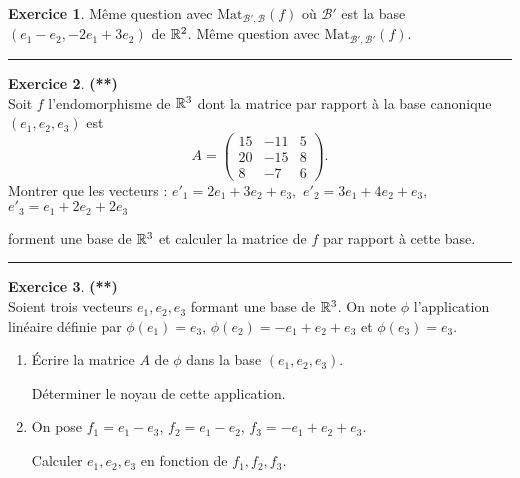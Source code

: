 \documentclass[a4paper,11pt]{article}
\theoremstyle{definition}
\newtheorem{exo}{Exercice} %
\begin{document}
\begin{minipage}{1\linewidth}
\begin{minipage}[t]{0.48\linewidth}
\begin{exo}
		Même question avec $\textrm{Mat}_{\mathcal{B}',\mathcal{B}}(f)$ où $\mathcal{B'}$ est la base 
		$(e_1 - e_2, -2e_1+3e_2)$ de $\mathbb{R}^2$.
		Même question avec $\textrm{Mat}_{\mathcal{B}',\mathcal{B}'}(f)$.	
			
		\centering\rule{1\linewidth}{0.6pt}\end{exo}
	
		\begin{exo}\textbf{(**)}\quad\\[0.2cm]
			Soit $f$ l'endomorphisme de $\mathbb{R}^3$ dont la matrice par
			rapport \`a la base canonique $(e_1, e_2, e_3)$ est
			$$A= \left( 
			\begin{array}{ccc}
			15 & -11 & 5 \\
			20 & -15 & 8 \\
			8 &  -7 & 6
			\end{array}
			\right).$$
			Montrer que les vecteurs : $ e'_1 = 2e_1+3e_2+e_3,$ $ e'_2 = 3e_1+4e_2+e_3,$\quad $ e'_3 = e_1+2e_2+2e_3$
			
			forment une base de $\mathbb{R}^3$ et calculer la matrice de $f$ par
			rapport \`a cette base.
	
	\centering\rule{1\linewidth}{0.6pt}\end{exo}
		
		
	\end{minipage}\hfill\vrule\hfill\begin{minipage}[t]{0.48\linewidth}\raggedright
		
					\begin{exo}\textbf{(**)}\quad\\[0.2cm]
			Soient trois vecteurs $e_1,e_2,e_3$ formant une base de $\mathbb{R}^3$.
			On note $\phi$ l'application linéaire définie par
			$\phi(e_1)=e_3$, $\phi(e_2)=-e_1+e_2+e_3$ et $\phi(e_3)=e_3$.
			
			\begin{enumerate}
				\item Écrire la matrice $A$ de $\phi$ dans la base $(e_1,e_2,e_3)$.
				
				Déterminer le noyau de cette application. 
				
				\item On pose $f_1=e_1-e_3$, $f_2=e_1-e_2$,  $f_3=-e_1+e_2+e_3$.
				
				Calculer $e_1,e_2,e_3$ en fonction de $f_1,f_2,f_3$.
				

\end{enumerate}
\end{exo}
\end{minipage}
\end{minipage}
\end{document}
